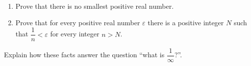 \begin{enumerate}
\item[(a)] Prove that there is no smallest positive real number.
\item[(b)] Prove that for every positive real number $\varepsilon$ there is a positive integer $N$ such that $\dfrac{1}{n}<\varepsilon$ for every integer $n>N$.
\end{enumerate}
Explain how these facts answer the question ``what is $\dfrac{1}{\infty}$?''.
